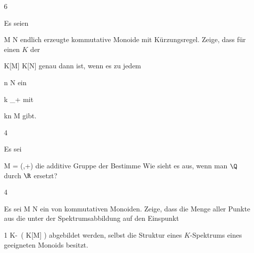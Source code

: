 
{6}
{





Es seien

\mavergleichskette
{\vergleichskette
{ M
}
{ \subseteq }{ N
}
{  }{
}
{    }{
}
{   }{
}
}
{}{}{}
endlich erzeugte kommutative Monoide mit Kürzungsregel. Zeige, dass für einen
$K$ der

\mavergleichskette
{\vergleichskette
{ K[M]
}
{ \subseteq }{ K[N]
}
{  }{
}
{    }{
}
{   }{
}
}
{}{}{}
genau dann
ist, wenn es zu jedem

\mavergleichskette
{\vergleichskette
{ n
}
{ \in }{ N
}
{  }{
}
{    }{
}
{   }{
}
}
{}{}{}
ein

\mavergleichskette
{\vergleichskette
{ k
}
{ \in }{ \N_+
}
{  }{
}
{    }{
}
{   }{
}
}
{}{}{}
mit

\mavergleichskette
{\vergleichskette
{ kn
}
{ \in }{ M
}
{  }{
}
{    }{
}
{   }{
}
}
{}{}{}
gibt.





}
{} {}

{4}
{





Es sei

\mavergleichskette
{\vergleichskette
{ M
}
{ = }{ (\Q,+)
}
{  }{
}
{    }{
}
{   }{
}
}
{}{}{}
die additive Gruppe der
Bestimme
 Wie sieht es aus, wenn man $\Q$ durch $\R$ ersetzt?





}
{} {}

{4}
{





Es sei
\maabb {\varphi} { M } { N
} {}
ein
von kommutativen Monoiden. Zeige, dass die Menge aller Punkte aus
 die unter der Spektrumsabbildung auf den Einspunkt

\mavergleichskette
{\vergleichskette
{ 1
}
{ \in }{ K\!-\!\, \left(   K[M]   \right)
}
{  }{
}
{    }{
}
{   }{
}
}
{}{}{}
 {} {} abgebildet werden, selbst die Struktur eines $K$-Spektrums eines geeigneten Monoids besitzt.





}
{} {}


